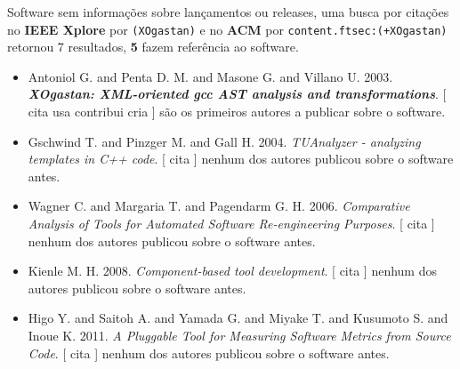 Software sem informações sobre lançamentos ou releases,
uma busca por citações no {\bf IEEE Xplore} por
\texttt{(XOgastan)}
e no {\bf ACM} por
\texttt{content.ftsec:(+XOgastan)}
retornou
7 resultados,
{\bf 5} fazem referência ao software.

\begin{itemize}
\item Antoniol G. and Penta D. M. and Masone G. and Villano U.
      2003.
        \textbf{\textit{ XOgastan: XML-oriented gcc AST analysis and transformations}}.
      [
          cita
          usa
          contribui
          cria
      ]
são os primeiros autores a publicar sobre o software.
\item Gschwind T. and Pinzger M. and Gall H.
      2004.
        \textit{ TUAnalyzer - analyzing templates in C++ code}.
      [
          cita
      ]
nenhum dos autores publicou sobre o software antes.
\item Wagner C. and Margaria T. and Pagendarm G. H.
      2006.
        \textit{ Comparative Analysis of Tools for Automated Software Re-engineering Purposes}.
      [
          cita
      ]
nenhum dos autores publicou sobre o software antes.
\item Kienle M. H.
      2008.
        \textit{ Component-based tool development}.
      [
          cita
      ]
nenhum dos autores publicou sobre o software antes.
\item Higo Y. and Saitoh A. and Yamada G. and Miyake T. and Kusumoto S. and Inoue K.
      2011.
        \textit{ A Pluggable Tool for Measuring Software Metrics from Source Code}.
      [
          cita
      ]
nenhum dos autores publicou sobre o software antes.
\end{itemize}

